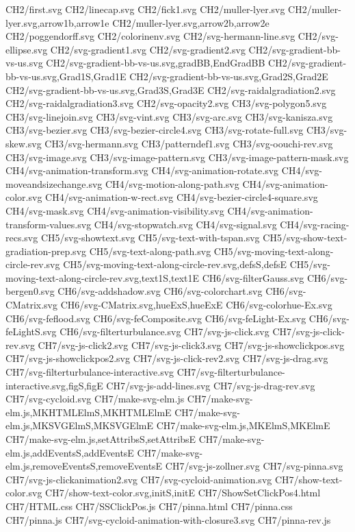 CH2/first.svg
CH2/linecap.svg
CH2/fick1.svg
CH2/muller-lyer.svg
CH2/muller-lyer.svg,arrow1b,arrow1e
CH2/muller-lyer.svg,arrow2b,arrow2e
CH2/poggendorff.svg
CH2/colorinenv.svg
CH2/svg-hermann-line.svg
CH2/svg-ellipse.svg
CH2/svg-gradient1.svg
CH2/svg-gradient2.svg
CH2/svg-gradient-bb-vs-us.svg
CH2/svg-gradient-bb-vs-us.svg,gradBB,EndGradBB
CH2/svg-gradient-bb-vs-us.svg,Grad1S,Grad1E
CH2/svg-gradient-bb-vs-us.svg,Grad2S,Grad2E
CH2/svg-gradient-bb-vs-us.svg,Grad3S,Grad3E
CH2/svg-raidalgradiation2.svg
CH2/svg-raidalgradiation3.svg
CH2/svg-opacity2.svg
CH3/svg-polygon5.svg
CH3/svg-linejoin.svg
CH3/svg-vint.svg
CH3/svg-arc.svg
CH3/svg-kanisza.svg
CH3/svg-bezier.svg
CH3/svg-bezier-circle4.svg
CH3/svg-rotate-full.svg
CH3/svg-skew.svg
CH3/svg-hermann.svg
CH3/patterndef1.svg
CH3/svg-oouchi-rev.svg
CH3/svg-image.svg
CH3/svg-image-pattern.svg
CH3/svg-image-pattern-mask.svg
CH4/svg-animation-transform.svg
CH4/svg-animation-rotate.svg
CH4/svg-moveandsizechange.svg
CH4/svg-motion-along-path.svg
CH4/svg-animation-color.svg
CH4/svg-animation-w-rect.svg
CH4/svg-bezier-circle4-square.svg
CH4/svg-mask.svg
CH4/svg-animation-visibility.svg
CH4/svg-animation-transform-values.svg
CH4/svg-stopwatch.svg
CH4/svg-signal.svg
CH4/svg-racing-recs.svg
CH5/svg-showtext.svg
CH5/svg-text-with-tspan.svg
CH5/svg-show-text-gradiation-prep.svg
CH5/svg-text-along-path.svg
CH5/svg-moving-text-along-circle-rev.svg
CH5/svg-moving-text-along-circle-rev.svg,defsS,defsE
CH5/svg-moving-text-along-circle-rev.svg,text1S,text1E
CH6/svg-filterGauss.svg
CH6/svg-bergen0.svg
CH6/svg-addshadow.svg
CH6/svg-colorchart.svg
CH6/svg-CMatrix.svg
CH6/svg-CMatrix.svg,hueExS,hueExE
CH6/svg-colorhue-Ex.svg
CH6/svg-feflood.svg
CH6/svg-feComposite.svg
CH6/svg-feLight-Ex.svg
CH6/svg-feLightS.svg
CH6/svg-filterturbulance.svg
CH7/svg-js-click.svg
CH7/svg-js-click-rev.svg
CH7/svg-js-click2.svg
CH7/svg-js-click3.svg
CH7/svg-js-showclickpos.svg
CH7/svg-js-showclickpos2.svg
CH7/svg-js-click-rev2.svg
CH7/svg-js-drag.svg
CH7/svg-filterturbulance-interactive.svg
CH7/svg-filterturbulance-interactive.svg,figS,figE
CH7/svg-js-add-lines.svg
CH7/svg-js-drag-rev.svg
CH7/svg-cycloid.svg
CH7/make-svg-elm.js
CH7/make-svg-elm.js,MKHTMLElmS,MKHTMLElmE
CH7/make-svg-elm.js,MKSVGElmS,MKSVGElmE
CH7/make-svg-elm.js,MKElmS,MKElmE
CH7/make-svg-elm.js,setAttribsS,setAttribsE
CH7/make-svg-elm.js,addEventsS,addEventsE
CH7/make-svg-elm.js,removeEventsS,removeEventsE
CH7/svg-js-zollner.svg
CH7/svg-pinna.svg
CH7/svg-js-clickanimation2.svg
CH7/svg-cycloid-animation.svg
CH7/show-text-color.svg
CH7/show-text-color.svg,initS,initE
CH7/ShowSetClickPos4.html
CH7/HTML.css
CH7/SSClickPos.js
CH7/pinna.html
CH7/pinna.css
CH7/pinna.js
CH7/svg-cycloid-animation-with-closure3.svg
CH7/pinna-rev.js
